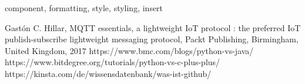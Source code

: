 \documentclass[conference]{IEEEtran}
\begin{document}
\begin{IEEEkeywords}
component, formatting, style, styling, insert
\end{IEEEkeywords}

















\begin{thebibliography}{00}
  Gastón C. Hillar, MQTT essentials, a lightweight IoT protocol : the preferred IoT publish-subscribe lightweight messaging protocol, Packt Publishing, Birmingham, United Kingdom, 2017
  https://www.bmc.com/blogs/python-vs-java/
  https://www.bitdegree.org/tutorials/python-vs-c-plus-plus/
  https://kinsta.com/de/wissensdatenbank/was-ist-github/
\end{thebibliography}
\vspace{12pt}
\end{document}
